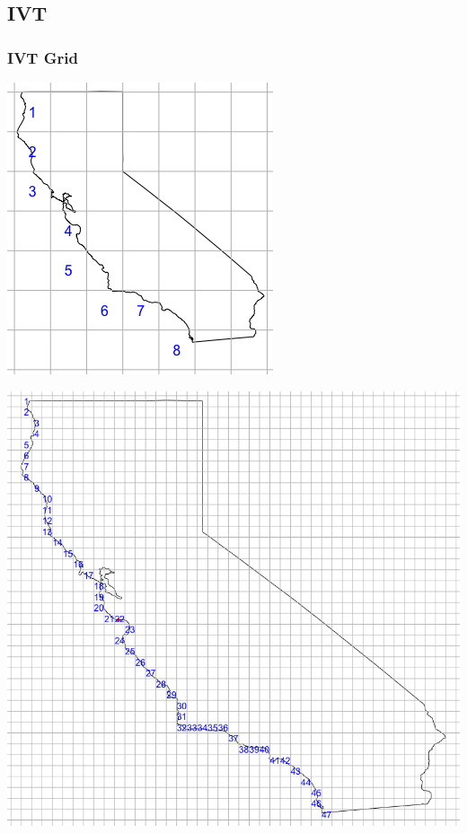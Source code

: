 \documentclass[aspectratio=169]{beamer}
\newlength{\frametextheight}
\begin{document}
\subsection*{IVT}
\begin{frame}
    \frametitle{IVT Grid}
    \begin{minipage}{.49\textwidth}
    \centering
    \includegraphics[height=\frametextheight]{./images/grid_8}
  \end{minipage}
  \begin{minipage}{.49\textwidth}
    \centering
    \includegraphics[height=\frametextheight]{./images/grid_47}
  \end{minipage}
\end{frame}
\end{document}
